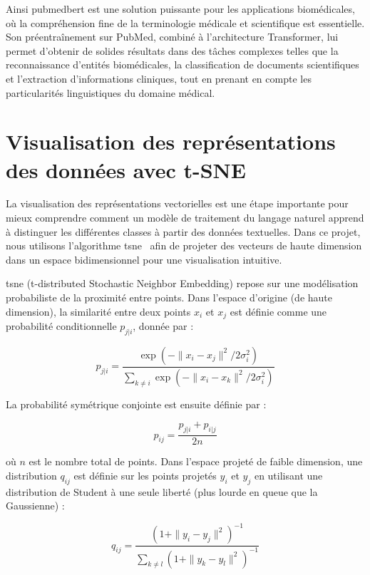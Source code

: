 \documentclass[12pt]{report}
\begin{document}
Ainsi \gls{pubmedbert} est une solution puissante pour les applications biomédicales, où la compréhension fine de la terminologie médicale et scientifique est essentielle. Son préentraînement sur PubMed, combiné à l’architecture Transformer, lui permet d’obtenir de solides résultats dans des tâches complexes telles que la reconnaissance d'entités biomédicales, la classification de documents scientifiques et l’extraction d’informations cliniques, tout en prenant en compte les particularités linguistiques du domaine médical.

\section{Visualisation des représentations des données avec t-SNE}
\label{sec:tsne}

La visualisation des représentations vectorielles est une étape importante pour mieux comprendre comment un modèle de traitement du langage naturel apprend à distinguer les différentes classes à partir des données textuelles. Dans ce projet, nous utilisons l’algorithme \gls{tsne}~\cite{van2008visualizing} afin de projeter des vecteurs de haute dimension dans un espace bidimensionnel pour une visualisation intuitive.

\gls{tsne} (t-distributed Stochastic Neighbor Embedding) repose sur une modélisation probabiliste de la proximité entre points. Dans l’espace d’origine (de haute dimension), la similarité entre deux points $x_i$ et $x_j$ est définie comme une probabilité conditionnelle $p_{j|i}$, donnée par :

\begin{equation}
p_{j|i} = \frac{\exp(-\|x_i - x_j\|^2 / 2\sigma_i^2)}{\sum_{k \neq i} \exp(-\|x_i - x_k\|^2 / 2\sigma_i^2)}
\end{equation}

La probabilité symétrique conjointe est ensuite définie par :

\begin{equation}
p_{ij} = \frac{p_{j|i} + p_{i|j}}{2n}
\end{equation}

où $n$ est le nombre total de points. Dans l’espace projeté de faible dimension, une distribution $q_{ij}$ est définie sur les points projetés $y_i$ et $y_j$ en utilisant une distribution de Student à une seule liberté (plus lourde en queue que la Gaussienne) :

\begin{equation}
q_{ij} = \frac{(1 + \|y_i - y_j\|^2)^{-1}}{\sum_{k \neq l} (1 + \|y_k - y_l\|^2)^{-1}}
\end{equation}
\end{document}
